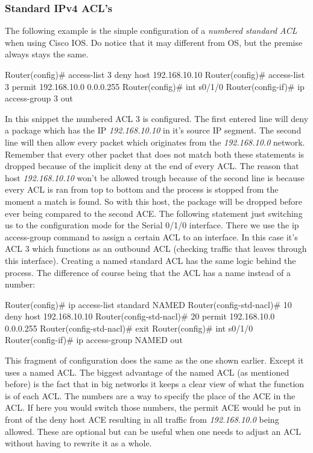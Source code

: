  \subsubsection{Standard IPv4 ACL's}
 The following example is the simple configuration of a \textit{numbered standard ACL} when using Cisco IOS. Do notice that it may different from OS, but the premise always stays the same.
\begin{cisco}[title=Numbered standard ACL]
Router(config)#  access-list 3 deny host 192.168.10.10
Router(config)#  access-list 3 permit 192.168.10.0 0.0.0.255
Router(config)#  int s0/1/0
Router(config-if)# ip access-group 3 out
\end{cisco}
In this snippet the numbered ACL 3 is configured. The first entered line will deny a package which has the IP \textit{192.168.10.10} in it's source IP segment. The second line will then allow every packet which originates from the \textit{192.168.10.0} network. Remember that every other packet that does not match both these statements is dropped because of the implicit deny at the end of every ACL. The reason that host \textit{192.168.10.10} won't be allowed trough because of the second line is because every ACL is ran from top to bottom and the process is stopped from the moment a match is found. So with this host, the package will be dropped before ever being compared to the second ACE.
The following statement just switching us to the configuration mode for the Serial 0/1/0 interface. There we use the ip access-group command to assign a certain ACL to an interface. In this case it's ACL 3 which functions as an outbound ACL (checking traffic that leaves through this interface).
Creating a named standard ACL has the same logic behind the process. The difference of course being that the ACL has a name instead of a number:
\begin{cisco}[title=Named standard ACL]
Router(config)#  ip access-list standard NAMED
Router(config-std-nacl)#  10 deny host 192.168.10.10
Router(config-std-nacl)#  20 permit 192.168.10.0 0.0.0.255
Router(config-std-nacl)#  exit
Router(config)#  int s0/1/0
Router(config-if)#  ip access-group NAMED out
\end{cisco}
This fragment of configuration does the same as the one shown earlier. Except it uses a named ACL. The biggest advantage of the named ACL (as mentioned before) is the fact that in big networks it keeps a clear view of what the function is of each ACL.
The numbers are a way to specify the place of the ACE in the ACL. If here you would switch those numbers, the permit ACE would be put in front of the deny host ACE resulting in all traffic from \textit{192.168.10.0} being allowed. These are optional but can be useful when one needs to adjust an ACL without having to rewrite it as a whole.
